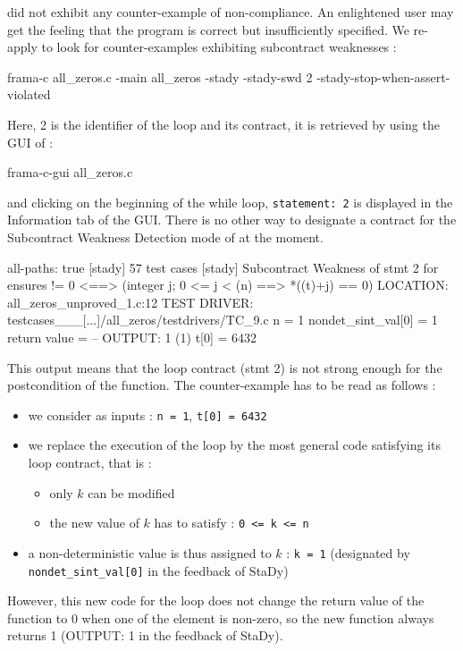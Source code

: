 \documentclass[web]{frama-c-book}
\begin{document}
\stady did not exhibit any counter-example of non-compliance. An enlightened user may get the feeling that the program is correct but insufficiently specified.
We re-apply \stady to look for counter-examples exhibiting subcontract weaknesses :

\begin{shell}
  frama-c all_zeros.c -main all_zeros -stady -stady-swd 2
  -stady-stop-when-assert-violated
\end{shell}

Here, 2 is the identifier of the loop and its contract, it is retrieved by using the GUI of \framac :

\begin{shell}
  frama-c-gui all_zeros.c
\end{shell}

and clicking on the beginning of the while loop, \texttt{statement: 2} is displayed in the Information tab of the GUI. There is no other way to designate a contract for the Subcontract Weakness Detection mode of \stady at the moment.

\begin{shell}
[stady] all-paths: true
[stady] 57 test cases
[stady] Subcontract Weakness of stmt 2 for ensures
                                           \result != 0 <==>
                                           (\forall integer j;
                                              0 <= j < \old(n) ==> *(\old(t)+j) == 0) 
        LOCATION: all_zeros_unproved_1.c:12
        TEST DRIVER: testcases___[...]/all_zeros/testdrivers/TC_9.c
        n = 1
        nondet_sint_val[0] = 1
        return value =  -- OUTPUT: 1 (1)
        t[0] = 6432
\end{shell}

This output means that the loop contract (stmt 2) is not strong enough for the postcondition of the function.
The counter-example has to be read as follows :
\begin{itemize}
\item we consider as inputs : \lstinline'n = 1', \lstinline't[0] = 6432'
\item we replace the execution of the loop by the most general code satisfying its loop contract, that is :
  \begin{itemize}
  \item only $k$ can be modified
  \item the new value of $k$ has to satisfy : \lstinline'0 <= k <= n'
  \end{itemize}
\item a non-deterministic value is thus assigned to $k$ : \lstinline'k = 1' (designated by \lstinline'nondet_sint_val[0]' in the feedback of StaDy)
\end{itemize}
However, this new code for the loop does not change the return value of the function to 0 when one of the element is non-zero, so the new function always returns 1 (OUTPUT: 1 in the feedback of StaDy).
\end{document}

